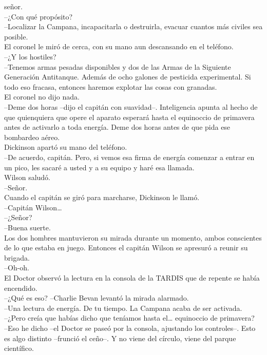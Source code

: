 señor.\\
--¿Con qué propósito?\\
--Localizar la Campana, incapacitarla o destruirla, evacuar cuantos más
civiles sea posible.\\
El coronel le miró de cerca, con su mano aun descansando en el
teléfono.\\
--¿Y los hostiles?\\
--Tenemos armas pesadas disponibles y dos de las Armas de la Siguiente
Generación Antitanque. Además de ocho galones de pesticida experimental.
Si todo eso fracasa, entonces haremos explotar las cosas con granadas.\\
El coronel no dijo nada.\\
--Deme dos horas --dijo el capitán con suavidad--. Inteligencia apunta
al hecho de que quienquiera que opere el aparato esperará hasta el
equinoccio de primavera antes de activarlo a toda energía. Deme dos
horas antes de que pida ese bombardeo aéreo.\\
Dickinson apartó su mano del teléfono.\\
--De acuerdo, capitán. Pero, si vemos esa firma de energía comenzar a
entrar en un pico, les sacaré a usted y a su equipo y haré esa
llamada.\\
Wilson saludó.\\
--Señor.\\
Cuando el capitán se giró para marcharse, Dickinson le llamó.\\
--Capitán Wilson\ldots{}\\
--¿Señor?\\
--Buena suerte.\\
Los dos hombres mantuvieron su mirada durante un momento, ambos
conscientes de lo que estaba en juego. Entonces el capitán Wilson se
apresuró a reunir su brigada.\\[2\baselineskip]--Oh-oh.\\
El Doctor observó la lectura en la consola de la TARDIS que de repente
se había encendido.\\
--¿Qué es eso? --Charlie Bevan levantó la mirada alarmado.\\
--Una lectura de energía. De tu tiempo. La Campana acaba de ser
activada.\\
--¿Pero creía que habías dicho que teníamos hasta el\ldots{} equinoccio
de primavera?\\
--Eso he dicho --el Doctor se paseó por la consola, ajustando los
controles--. Esto es algo distinto --frunció el ceño--. Y no viene del
círculo, viene del parque científico.\\
